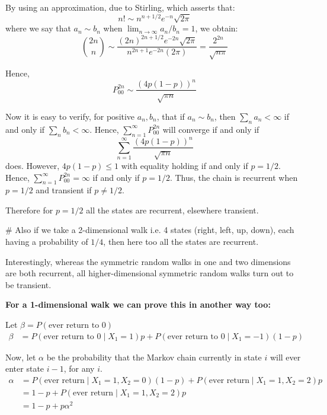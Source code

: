 \documentclass[12pt,a4paper]{article}
\begin{document}
By using an approximation, due to Stirling, which asserts that:
\begin{equation}
    n! \sim n^{n+1/2} e^{-n} \sqrt{2\pi} \tag{4.3}
\end{equation}
where we say that $a_n \sim b_n$ when $\lim_{n \to \infty} a_n/b_n = 1$, we obtain:
\[ \binom{2n}{n} \sim \frac{(2n)^{2n+1/2} e^{-2n} \sqrt{2\pi}}{n^{2n+1} e^{-2n} (2\pi)} = \frac{2^{2n}}{\sqrt{n\pi}} \]

Hence,
\[ P_{00}^{2n} \sim \frac{(4p(1-p))^n}{\sqrt{\pi n}} \]

Now it is easy to verify, for positive $a_n, b_n$, that if $a_n \sim b_n$, then $\sum_n a_n < \infty$ if and only if $\sum_n b_n < \infty$. Hence, $\sum_{n=1}^\infty P_{00}^{2n}$ will converge if and only if
\[ \sum_{n=1}^\infty \frac{(4p(1-p))^n}{\sqrt{\pi n}} \]
does. However, $4p(1-p) \le 1$ with equality holding if and only if $p = 1/2$. Hence, $\sum_{n=1}^\infty P_{00}^{2n} = \infty$ if and only if $p = 1/2$. Thus, the chain is recurrent when $p = 1/2$ and transient if $p \ne 1/2$.

Therefore for $p = 1/2$ all the states are recurrent, elsewhere transient.

\# Also if we take a 2-dimensional walk i.e. 4 states (right, left, up, down), each having a probability of $1/4$, then here too all the states are recurrent.

Interestingly, whereas the symmetric random walks in one and two dimensions are both recurrent, all higher-dimensional symmetric random walks turn out to be transient.

\vspace{0.3cm}
\textbf{For a 1-dimensional walk we can prove this in another way too:}

Let $\beta = P(\text{ever return to } 0)$
\begin{align*}
    \beta &= P(\text{ever return to } 0 \mid X_1 = 1)p + P(\text{ever return to } 0 \mid X_1 = -1)(1 - p)
\end{align*}

Now, let $\alpha$ be the probability that the Markov chain currently in state $i$ will ever enter state $i - 1$, for any $i$.
\begin{align*}
    \alpha &= P(\text{ever return} \mid X_1 = 1, X_2 = 0)(1 - p) + P(\text{ever return} \mid X_1 = 1, X_2 = 2)p \\
    &= 1 - p + P(\text{ever return} \mid X_1 = 1, X_2 = 2)p \\
    &= 1 - p + p\alpha^2
\end{align*}
\end{document}
